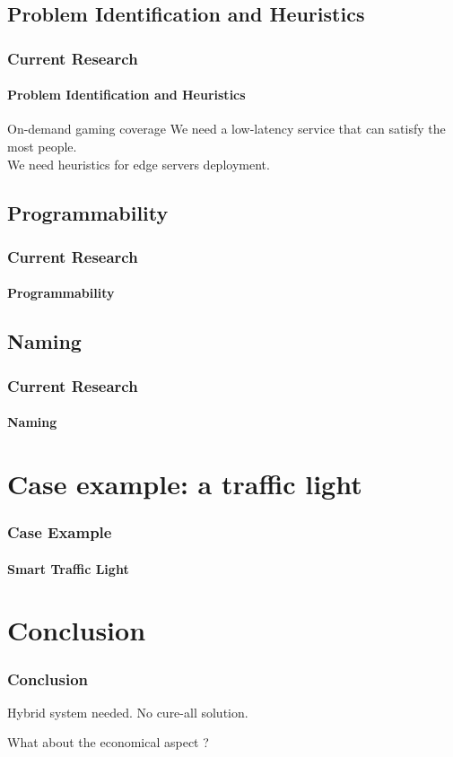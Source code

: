 \documentclass[utf8,xcolor=table, page number]{earlywinter}
\begin{document}
\subsection{Problem Identification and Heuristics}
\begin{frame}
  \frametitle{Current Research}
  \framesubtitle{Problem Identification and Heuristics}
  \begin{exampleblock}{On-demand gaming coverage} %
    We need a low-latency service that can satisfy the most people.\\
    We need heuristics for edge servers deployment.
  \end{exampleblock}
\end{frame}
\subsection{Programmability}
\begin{frame}
  \frametitle{Current Research}
  \framesubtitle{Programmability}
\end{frame}
\subsection{Naming}
\begin{frame}
  \frametitle{Current Research}
  \framesubtitle{Naming}
\end{frame}

\section{Case example: a traffic light}
\begin{frame}
  \frametitle{Case Example}
  \framesubtitle{Smart Traffic Light}
\end{frame}
\section{Conclusion}
\begin{frame}
  \frametitle{Conclusion}
  Hybrid system needed.
  No cure-all solution.
  
  What about the economical aspect ?
  
\end{frame}
\end{document}
